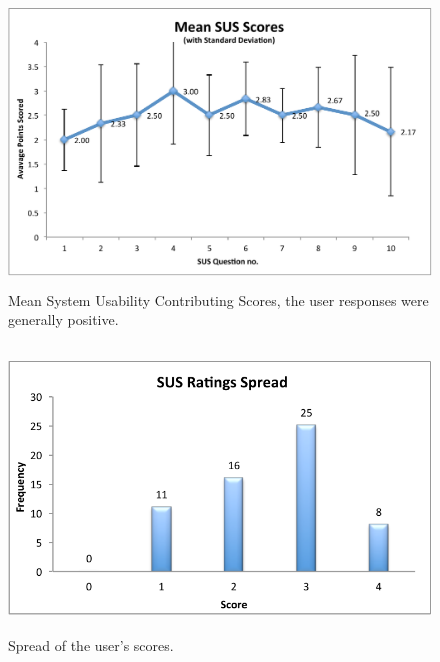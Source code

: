 \begin{figure}[htb]
	\centering
		\includegraphics[height=3in]{figures/SUS_Mean.pdf}
	\caption{Mean System Usability Contributing Scores, the user responses were generally positive.}
	\label{fig:figures_SUS_Mean}
\end{figure}

\begin{figure}[htb]
	\centering
		\includegraphics[height=3in]{figures/SUS_Spread.pdf}
	\caption{Spread of the user's scores.}
	\label{fig:figures_SUS_Spread}
\end{figure}